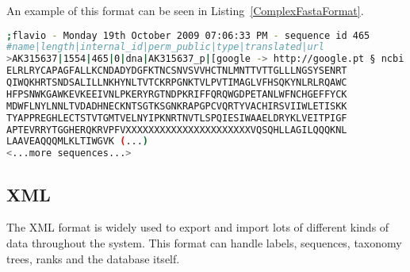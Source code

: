 \begin{itemize}
  An example of this format can be seen in Listing~\ref{ComplexFastaFormat}.\\
  
\begin{lstlisting}[float, language=bash,frame=single,breaklines=true,caption={Complex FASTA format example.}, label=ComplexFastaFormat]
;flavio - Monday 19th October 2009 07:06:33 PM - sequence id 465
#name|length|internal_id|perm_public|type|translated|url
>AK315637|1554|465|0|dna|AK315637_p|[google -> http://google.pt § ncbi -> http://www.ncbi.nlm.nih.gov/]
ELRLRYCAPAGFALLKCNDADYDGFKTNCSNVSVVHCTNLMNTTVTTGLLLNGSYSENRT
QIWQKHRTSNDSALILLNKHYNLTVTCKRPGNKTVLPVTIMAGLVFHSQKYNLRLRQAWC
HFPSNWKGAWKEVKEEIVNLPKERYRGTNDPKRIFFQRQWGDPETANLWFNCHGEFFYCK
MDWFLNYLNNLTVDADHNECKNTSGTKSGNKRAPGPCVQRTYVACHIRSVIIWLETISKK
TYAPPREGHLECTSTVTGMTVELNYIPKNRTNVTLSPQIESIWAAELDRYKLVEITPIGF
APTEVRRYTGGHERQKRVPFVXXXXXXXXXXXXXXXXXXXXXXVQSQHLLAGILQQQKNL
LAAVEAQQQMLKLTIWGVK (...)
<...more sequences...>
\end{lstlisting}
  
\end{itemize}

\subsection{XML}

The XML format is widely used to export and import lots of different kinds of data throughout the system. This format can handle labels, sequences, taxonomy trees, ranks and the database itself.

